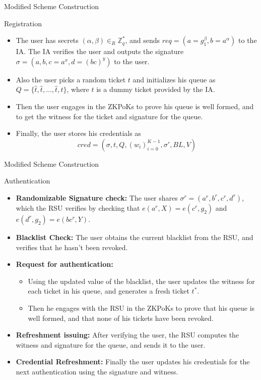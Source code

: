 \documentclass[
	xcolor={svgnames},
	hyperref={pagebackref,bookmarks},
	aspectratio=43,
]{beamer}
\begin{document}
\begin{frame}{Modified Scheme Construction}
	\begin{block}{Registration}
		\begin{itemize}
			\item The user has secrets $(\alpha, \beta) \in_R \mathbb{Z}_q^*$, and sends $req = (a = g_1^{\beta}, b = a^{\alpha})$ to the IA. The IA verifies the user and outputs the signature $\sigma = (a, b, c = a^x, d = (bc)^y)$ to the user.
			\item Also the user picks a random ticket $t$ and initializes his queue as $ Q = \{ \hat{t}, \hat{t}, \dots, \hat{t}, t \} $, where $\hat{t}$ is a dummy ticket provided by the IA.
			\item Then the user engages in the ZKPoKs to prove his queue is well formed, and to get the witness for the ticket and signature for the queue.
			\item Finally, the user stores his credentials as \vspace*{-2mm}
			$$ cred = (\sigma, t, Q, (w_i)_{i=0}^{K-1}, \sigma', BL, V) $$
		\end{itemize}
	\end{block}
\end{frame}

\begin{frame}{Modified Scheme Construction}
	\vspace*{-2mm}
	\begin{block}{Authentication}
		\begin{itemize}
			\item \textbf{Randomizable Signature check: } The user shares $\sigma^r = (a^r, b^r, c^r, d^r)$, which the RSU verifies by checking that $e(a^r, X) = e(c^r, g_2)$ and $e(d^r, g_2) = e(bc^r, Y)$.
			\item \textbf{Blacklist Check: } The user obtains the current blacklist from the RSU, and verifies that he hasn't been revoked.
			\item \textbf{Request for authentication: } 
			\begin{itemize}
				\item Using the updated value of the blacklist, the user updates the witness for each ticket in his queue, and generates a fresh ticket $t^*$.
				\item Then he engages with the RSU in the ZKPoKs to prove that his queue is well formed, and that none of his tickets have been revoked.
			\end{itemize}
			\item \textbf{Refreshment issuing: } After verifying the user, the RSU computes the witness and signature for the queue, and sends it to the user.
			\item \textbf{Credential Refreshment: } Finally the user updates his credentials for the next authentication using the signature and witness.
		\end{itemize}
	\end{block}
\end{frame}
\end{document}
